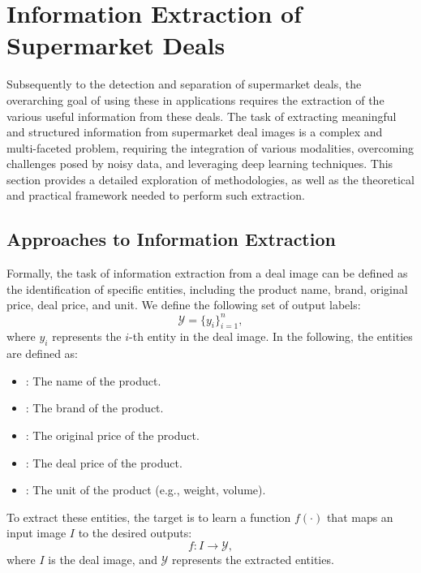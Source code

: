 \documentclass[11pt]{article}
\begin{document}
\section{Information Extraction of Supermarket Deals}
\label{sec:information_extraction}
Subsequently to the detection and separation of supermarket deals, the overarching goal of using these in applications requires the extraction of the various useful information from these deals. 
The task of extracting meaningful and structured information from supermarket deal images is a complex and multi-faceted problem, requiring the integration of various modalities, overcoming challenges posed by noisy data, and leveraging deep learning techniques. This section provides a detailed exploration of methodologies, as well as the theoretical and practical framework needed to perform such extraction.

\subsection{Approaches to Information Extraction}
Formally, the task of information extraction from a deal image can be defined as the identification of specific entities, including the product name, brand, original price, deal price, and unit. We define the following set of output labels:
\begin{equation}
\mathcal{Y} = \{y_{i}\}_{i=1}^{n},
\end{equation}
where $y_{i}$ represents the $i$-th entity in the deal image. In the following, the entities are defined as:
\begin{itemize}
    \item {}: The name of the product.
    \item {}: The brand of the product.
    \item {}: The original price of the product.
    \item {}: The deal price of the product.
    \item {}: The unit of the product (e.g., weight, volume).
\end{itemize}

To extract these entities, the target is to learn a function $f(\cdot)$ that maps an input image $I$ to the desired outputs:
\begin{equation}
    f: I \to \mathcal{Y},
\end{equation}
where $ I $ is the deal image, and $ \mathcal{Y} $ represents the extracted entities.
\end{document}
